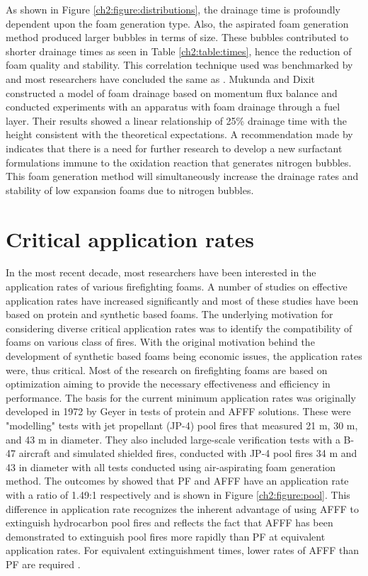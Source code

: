 \documentclass[12pt]{report}
\begin{document}
As shown in Figure \ref{ch2:figure:distributions}, the drainage time is profoundly dependent upon the foam generation type. Also, the aspirated foam generation method produced larger bubbles in terms of size. These bubbles contributed to shorter drainage times as seen in Table \ref{ch2:table:times}, hence the reduction of foam quality and stability. This correlation technique used was benchmarked by \cite{oguike2013study} and most researchers have concluded the same as \cite{laundess2012suppression}. Mukunda and Dixit \cite{csb2016phenomenological} constructed a model of foam drainage based on momentum flux balance and conducted experiments with an apparatus with foam drainage through a fuel layer. Their results showed a linear relationship of 25\% drainage time with the height consistent with the theoretical expectations. A recommendation made by \cite{laundess2012suppression} indicates that there is a need for further research to develop a new surfactant formulations immune to the oxidation reaction that generates nitrogen bubbles. This foam generation method will simultaneously increase the drainage rates and stability of low expansion foams due to nitrogen bubbles.

\section{Critical application rates}
In the most recent decade, most researchers have been interested in the application rates of various firefighting foams. A number of studies on effective application rates have increased significantly and most of these studies have been based on protein and synthetic based foams. The underlying motivation for considering diverse critical application rates was to identify the compatibility of foams on various class of fires. With the original motivation behind the development of synthetic based foams being economic issues, the application rates were, thus critical.
Most of the research on firefighting foams are based on optimization aiming to provide the necessary effectiveness and efficiency in performance. The basis for the current minimum application rates was originally developed in 1972 by Geyer \cite{geyer1972evaluation} in tests of protein and AFFF solutions. These were "modelling" tests with jet propellant (JP-4) pool fires that measured 21 m, 30 m, and 43 m in diameter. They also included large-scale verification tests with a B-47 aircraft and simulated shielded fires, conducted with JP-4 pool fires 34 m and 43 in diameter with all tests conducted using air-aspirating foam generation method. The outcomes by \cite{geyer1972evaluation} showed that PF and AFFF have an application rate with a ratio of 1.49:1 respectively and is shown in Figure \ref{ch2:figure:pool}. This difference in application rate recognizes the inherent advantage of using AFFF to extinguish hydrocarbon pool fires and reflects the fact that AFFF has been demonstrated to extinguish pool fires more rapidly than PF at equivalent application rates. For equivalent extinguishment times, lower rates of AFFF than PF are required \cite{scheffey1995evaluating}.
\end{document}
